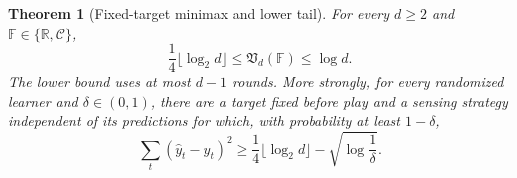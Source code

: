 \documentclass[twoside]{article}
\newtheorem{theorem}{Theorem}
\newcommand{\C}{\mathcal C}
\newcommand{\R}{\mathbb R}
\begin{document}
\begin{theorem}[Fixed-target minimax and lower tail]
\label{thm:phase-minimax}
For every $d\geq2$ and $\mathbb F\in\{\R,\C\}$,
\begin{equation}
\frac14\lfloor\log_2d\rfloor\leq\mathfrak V_d(\mathbb F)\leq\log d.
\label{eq:minimax-sandwich}
\end{equation}
The lower bound uses at most $d-1$ rounds. More strongly, for every randomized learner and $\delta\in(0,1)$, there are a target fixed before play and a sensing strategy independent of its predictions for which, with probability at least $1-\delta$,
\begin{equation}
\sum_t(\widehat y_t-y_t)^2\geq\frac14\lfloor\log_2d\rfloor-\sqrt{\log\frac1\delta}.
\label{eq:phase-lower-tail}
\end{equation}
\end{theorem}
\end{document}
